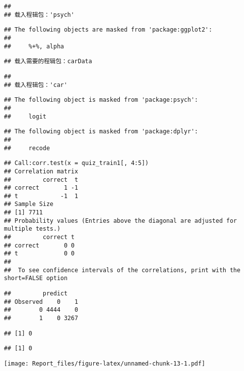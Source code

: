 \documentclass[
]{article}
\begin{document}
\begin{verbatim}
## 
## 载入程辑包：'psych'
\end{verbatim}

\begin{verbatim}
## The following objects are masked from 'package:ggplot2':
## 
##     %+%, alpha
\end{verbatim}

\begin{verbatim}
## 载入需要的程辑包：carData
\end{verbatim}

\begin{verbatim}
## 
## 载入程辑包：'car'
\end{verbatim}

\begin{verbatim}
## The following object is masked from 'package:psych':
## 
##     logit
\end{verbatim}

\begin{verbatim}
## The following object is masked from 'package:dplyr':
## 
##     recode
\end{verbatim}

\begin{verbatim}
## Call:corr.test(x = quiz_train1[, 4:5])
## Correlation matrix 
##         correct  t
## correct       1 -1
## t            -1  1
## Sample Size 
## [1] 7711
## Probability values (Entries above the diagonal are adjusted for multiple tests.) 
##         correct t
## correct       0 0
## t             0 0
## 
##  To see confidence intervals of the correlations, print with the short=FALSE option
\end{verbatim}

\begin{verbatim}
##         predict
## Observed    0    1
##        0 4444    0
##        1    0 3267
\end{verbatim}

\begin{verbatim}
## [1] 0
\end{verbatim}

\begin{verbatim}
## [1] 0
\end{verbatim}

\texttt{[image: Report\_files/figure-latex/unnamed-chunk-13-1.pdf]}
\end{document}
